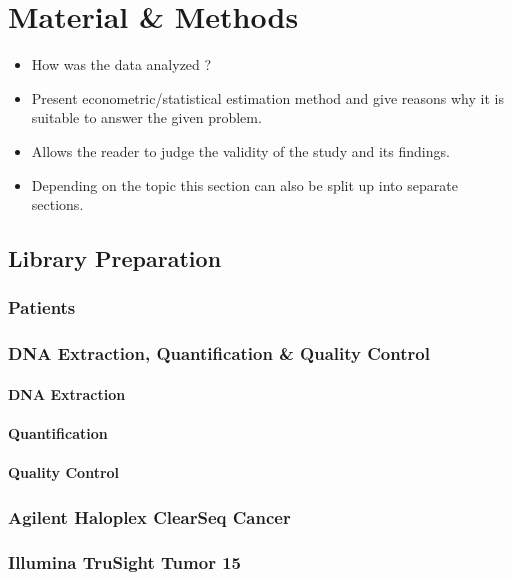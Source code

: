 \section{Material & Methods}\label{Sec:Method}

\begin{itemize}

\item How was the data analyzed ?

\item Present econometric/statistical estimation method and
give reasons why it is suitable to answer the given problem.

\item Allows the reader to judge the validity of the study and
its findings.

\item Depending on the topic this section can also be split up
into separate sections.

\end{itemize}

\subsection{Library Preparation}
\subsubsection{Patients}
\subsubsection{DNA Extraction, Quantification & Quality Control}
\paragraph{DNA Extraction}
\paragraph{Quantification}
\paragraph{Quality Control}
\subsubsection{Agilent Haloplex ClearSeq Cancer}
\subsubsection{Illumina TruSight Tumor 15}
